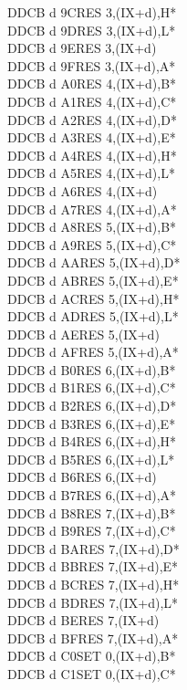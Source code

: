 \documentclass[oneside,a4paper]{book}
\begin{document}
\begin{multicols}{3}
{\begin{tabbing}
DDCB d 9C\>RES 3,(IX+d),H*\\
DDCB d 9D\>RES 3,(IX+d),L*\\
DDCB d 9E\>RES 3,(IX+d)\\
DDCB d 9F\>RES 3,(IX+d),A*\\
DDCB d A0\>RES 4,(IX+d),B*\\
DDCB d A1\>RES 4,(IX+d),C*\\
DDCB d A2\>RES 4,(IX+d),D*\\
DDCB d A3\>RES 4,(IX+d),E*\\
DDCB d A4\>RES 4,(IX+d),H*\\
DDCB d A5\>RES 4,(IX+d),L*\\
DDCB d A6\>RES 4,(IX+d)\\
DDCB d A7\>RES 4,(IX+d),A*\\
DDCB d A8\>RES 5,(IX+d),B*\\
DDCB d A9\>RES 5,(IX+d),C*\\
DDCB d AA\>RES 5,(IX+d),D*\\
DDCB d AB\>RES 5,(IX+d),E*\\
DDCB d AC\>RES 5,(IX+d),H*\\
DDCB d AD\>RES 5,(IX+d),L*\\
DDCB d AE\>RES 5,(IX+d)\\
DDCB d AF\>RES 5,(IX+d),A*\\
DDCB d B0\>RES 6,(IX+d),B*\\
DDCB d B1\>RES 6,(IX+d),C*\\
DDCB d B2\>RES 6,(IX+d),D*\\
DDCB d B3\>RES 6,(IX+d),E*\\
DDCB d B4\>RES 6,(IX+d),H*\\
DDCB d B5\>RES 6,(IX+d),L*\\
DDCB d B6\>RES 6,(IX+d)\\
DDCB d B7\>RES 6,(IX+d),A*\\
DDCB d B8\>RES 7,(IX+d),B*\\
DDCB d B9\>RES 7,(IX+d),C*\\
DDCB d BA\>RES 7,(IX+d),D*\\
DDCB d BB\>RES 7,(IX+d),E*\\
DDCB d BC\>RES 7,(IX+d),H*\\
DDCB d BD\>RES 7,(IX+d),L*\\
DDCB d BE\>RES 7,(IX+d)\\
DDCB d BF\>RES 7,(IX+d),A*\\
DDCB d C0\>SET 0,(IX+d),B*\\
DDCB d C1\>SET 0,(IX+d),C*\\

\end{tabbing}}
\end{multicols}
\end{document}
